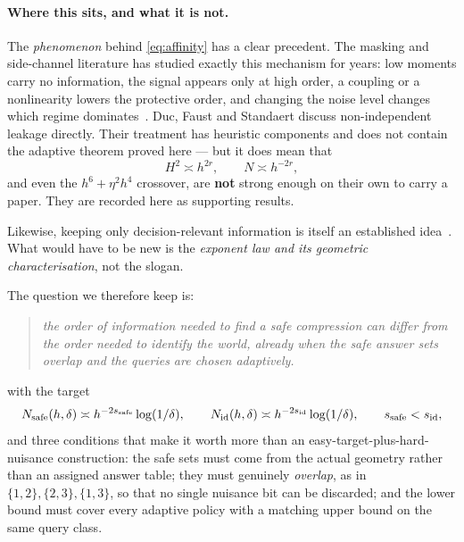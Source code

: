 \paragraph{Where this sits, and what it is not.}
The \emph{phenomenon} behind \eqref{eq:affinity} has a clear precedent. The masking and
side-channel literature has studied exactly this mechanism for years: low moments carry no
information, the signal appears only at high order, a coupling or a nonlinearity lowers
the protective order, and changing the noise level changes which regime
dominates~\cite{duc2015}. Duc, Faust and Standaert discuss non-independent leakage
directly. Their treatment has heuristic components and does not contain the adaptive
theorem proved here --- but it does mean that
\[
H^{2}\asymp h^{2r},\qquad N\asymp h^{-2r},
\]
and even the $h^{6}+\eta^{2}h^{4}$ crossover, are \textbf{not} strong enough on their own
to carry a paper. They are recorded here as supporting results.

Likewise, keeping only decision-relevant information is itself an established
idea~\cite{poli2023}. What would have to be new is the \emph{exponent law and its
geometric characterisation}, not the slogan.

The question we therefore keep is:

\begin{quote}
\emph{the order of information needed to find a safe compression can differ from the order
needed to identify the world, already when the safe answer sets overlap and the queries are
chosen adaptively.}
\end{quote}

with the target
\[
N_{\rm safe}(h,\delta)\asymp h^{-2s_{\rm safe}}\log(1/\delta),
\qquad
N_{\rm id}(h,\delta)\asymp h^{-2s_{\rm id}}\log(1/\delta),
\qquad s_{\rm safe}<s_{\rm id},
\]
and three conditions that make it worth more than an easy-target-plus-hard-nuisance
construction: the safe sets must come from the actual  geometry rather
than an assigned answer table; they must genuinely \emph{overlap}, as in
$\{1,2\},\{2,3\},\{1,3\}$, so that no single nuisance bit can be discarded; and the lower
bound must cover every adaptive policy with a matching upper bound on the same query class.


